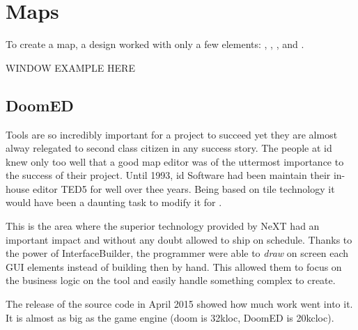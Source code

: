 

\section{Maps}
To create a map, a design worked with only a few elements: , , , and .\\
\par
{}
\par
\pagebreak


WINDOW EXAMPLE HERE\\
\par
\pagebreak



\subsection{DoomED}
Tools are so incredibly important for a project to succeed yet they are almost alway relegated to second class citizen in any success story. The people at id knew only too well that a good map editor was of the uttermost importance to the success of their project. Until 1993, id Software had been maintain their in-house editor TED5 for well over thee years. Being based on tile technology it would have been a daunting task to modify it for \doom.\\
\par
This is the area where the superior technology provided by NeXT had an important impact and without any doubt allowed \doom to ship on schedule. Thanks to the power of InterfaceBuilder, the programmer were able to \textit{draw} on screen each GUI elements instead of building then by hand. This allowed them to focus on the business logic on the tool and easily handle something complex to create.\\
\par
{}
\par

The release of the source code in April 2015 showed how much work went into it. It is almost as big as the game engine (doom is 32kloc, DoomED is 20kcloc).\\
\par
{}
\par
{}\\
\par
{}
\par


